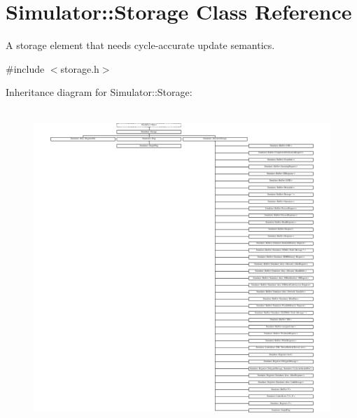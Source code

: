\hypertarget{class_simulator_1_1_storage}{\section{Simulator\+:\+:Storage Class Reference}
\label{class_simulator_1_1_storage}
}


A storage element that needs cycle-\/accurate update semantics.  




{\ttfamily \#include $<$storage.\+h$>$}

Inheritance diagram for Simulator\+:\+:Storage\+:\begin{figure}[H]
\begin{center}
\leavevmode
\includegraphics[height=12.000000cm]{class_simulator_1_1_storage}
\end{center}
\end{figure}
